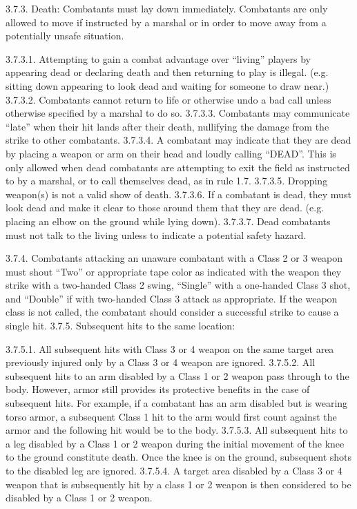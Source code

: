 \documentclass[12pt]{article}
\begin{document}
\begin{level}[start=0]
3.7.3. Death: Combatants must lay down immediately. Combatants are only allowed to move if instructed by a marshal or in order to move away from a potentially unsafe situation.

3.7.3.1. Attempting to gain a combat advantage over “living” players by appearing dead or declaring death and then returning to play is illegal. (e.g. sitting down appearing to look dead and waiting for someone to draw near.)
3.7.3.2. Combatants cannot return to life or otherwise undo a bad call unless otherwise specified by a marshal to do so.
3.7.3.3. Combatants may communicate “late” when their hit lands after their death, nullifying the damage from the strike to other combatants.
3.7.3.4. A combatant may indicate that they are dead by placing a weapon or arm on their head and loudly calling “DEAD”. This is only allowed when dead combatants are attempting to exit the field as instructed to by a marshal, or to call themselves dead, as in rule 1.7.
3.7.3.5. Dropping weapon(s) is not a valid show of death.
3.7.3.6. If a combatant is dead, they must look dead and make it clear to those around them that they are dead. (e.g. placing an elbow on the ground while lying down).
3.7.3.7. Dead combatants must not talk to the living unless to indicate a potential safety hazard.

3.7.4. Combatants attacking an unaware combatant with a Class 2 or 3 weapon must shout “Two” or appropriate tape color as indicated with the weapon they strike with a two-handed Class 2 swing, “Single” with a one-handed Class 3 shot, and “Double” if with two-handed Class 3 attack as appropriate. If the weapon class is not called, the combatant should consider a successful strike to cause a single hit.
3.7.5. Subsequent hits to the same location:

3.7.5.1. All subsequent hits with Class 3 or 4 weapon on the same target area previously injured only by a Class 3 or 4 weapon are ignored.
3.7.5.2. All subsequent hits to an arm disabled by a Class 1 or 2 weapon pass through to the body. However, armor still provides its protective benefits in the case of subsequent hits. For example, if a combatant has an arm disabled but is wearing torso armor, a subsequent Class 1 hit to the arm would first count against the armor and the following hit would be to the body.
3.7.5.3. All subsequent hits to a leg disabled by a Class 1 or 2 weapon during the initial movement of the knee to the ground constitute death. Once the knee is on the ground, subsequent shots to the disabled leg are ignored.
3.7.5.4. A target area disabled by a Class 3 or 4 weapon that is subsequently hit by a class 1 or 2 weapon is then considered to be disabled by a Class 1 or 2 weapon.


\end{level}
\end{document}
